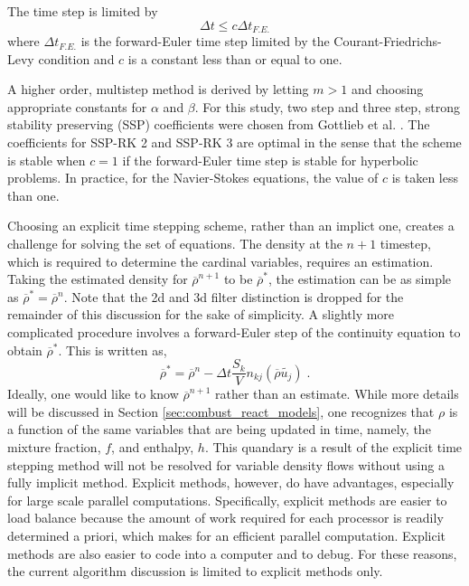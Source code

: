 The time step is limited by
%
\begin{equation}
\Delta t \leq c \Delta t_{F.E.}
\end{equation}
%
where $\Delta t_{F.E.}$ is the forward-Euler time step limited by
the Courant-Friedrichs-Levy condition and $c$ is a constant less
than or equal to one.  

A higher order, multistep method is derived by letting $m > 1$ and choosing appropriate constants for $\alpha$ and $\beta$. For this study, two step and three step, strong stability preserving (SSP) coefficients were chosen from Gottlieb et al. \cite{Gottlieb75}.  The coefficients for SSP-RK 2 and SSP-RK 3 are optimal in the sense that the scheme is stable when $c=1$ if the forward-Euler time step is stable for hyperbolic problems.  In practice, for the Navier-Stokes equations, the value of $c$ is taken less than one.

Choosing an explicit time stepping scheme, rather than an implict one, creates a challenge for solving the set of equations.  The density at the $n+1$ timestep, which is required to determine the cardinal variables,  requires an estimation.  Taking the estimated density for  $\overline{\rho}^{n+1}$ to be $\overline{\rho}^*$, the estimation can be as simple as $\overline{\rho}^* = \overline{\rho}^n$.  Note that the 2d and 3d filter distinction is dropped for the remainder of this discussion for the sake of simplicity.  A slightly more complicated procedure involves a forward-Euler step of the continuity equation to obtain $\overline{\rho}^*$.  This is written as,  
%
\begin{equation}\label{eqn:rho_update}
\overline{\rho}^{ *} = \overline{\rho}^{ n} - \Delta t \frac{S_k}{V} n_{kj} \left(  \overline{\rho} \widetilde{u_j} \right) \; .
\end{equation}
%
Ideally, one would like to know $\overline{\rho}^{n+1}$ rather than an estimate.  While more details will be discussed in Section \ref{sec:combust_react_models}, one recognizes that $\rho$ is a function of the same variables that are being updated in time, namely, the mixture fraction, $f$, and enthalpy, $h$.  This quandary is a result of the explicit time stepping method will not be resolved for variable density flows without using a fully implicit method.  Explicit methods, however, do have advantages, especially for large scale parallel computations.  Specifically, explicit methods are easier to load balance because the amount of work required for each processor is readily determined a priori, which makes for an efficient parallel computation.  Explicit methods are also easier to code into a computer and to debug.  For these reasons, the current algorithm discussion is limited to explicit methods only. 

